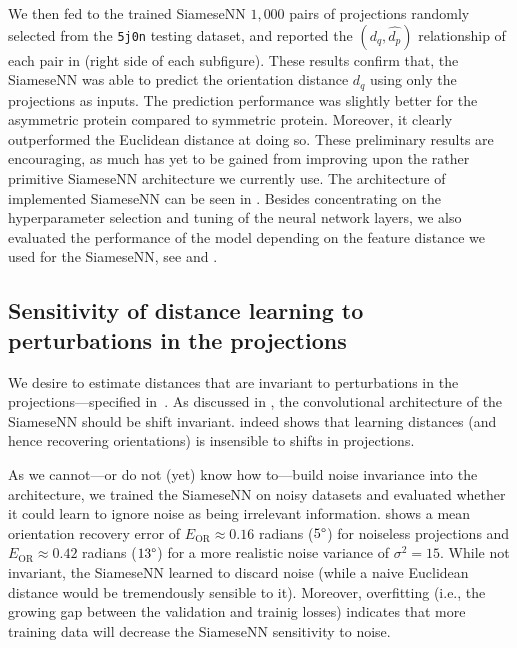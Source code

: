We then fed to the trained SiameseNN $1,000$ pairs of projections randomly selected from the \texttt{5j0n} testing dataset, and reported the $(d_q,\widehat{d_p})$ relationship of each pair in  (right side of each subfigure).
These results confirm that, the SiameseNN was able to predict the orientation distance $d_q$ using only the projections as inputs.
The prediction performance was slightly better for the asymmetric protein compared to symmetric protein.
Moreover, it clearly outperformed the Euclidean distance at doing so.
These preliminary results are encouraging, as much has yet to be gained from improving upon the rather primitive SiameseNN architecture we currently use.
The architecture of implemented SiameseNN can be seen in .
Besides concentrating on the hyperparameter selection and tuning of the neural network layers, we also evaluated the performance of the model depending on the feature distance we used for the SiameseNN, see  and .


\subsection{Sensitivity of distance learning to perturbations in the projections}\label{sec:results:distance-estimation:sensitivity}


We desire to estimate distances that are invariant to perturbations in the projections---specified in~.
As discussed in , the convolutional architecture of the SiameseNN should be shift invariant.
 indeed shows that learning distances (and hence recovering orientations) is insensible to shifts in projections.

As we cannot---or do not (yet) know how to---build noise invariance into the architecture, we trained the SiameseNN on noisy datasets and evaluated whether it could learn to ignore noise as being irrelevant information.
 shows a mean orientation recovery error of $E_\text{OR} \approx 0.16$ radians ($5\degree$) for noiseless projections and $E_\text{OR} \approx 0.42$ radians ($13\degree$) for a more realistic noise variance of $\sigma^2=15$.
While not invariant, the SiameseNN learned to discard noise (while a naive Euclidean distance would be tremendously sensible to it).
Moreover, overfitting (i.e., the growing gap between the validation and trainig losses) indicates that more training data will decrease the SiameseNN sensitivity to noise.

